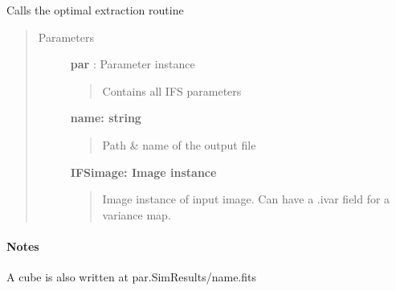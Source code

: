 \documentclass[letterpaper,10pt,english]{sphinxmanual}
\begin{document}

\begin{fulllineitems}
\label{tools:tools.reduction.intOptimalExtract}
Calls the optimal extraction routine
\begin{quote}\begin{description}
\item[{Parameters}] \leavevmode
\textbf{par} :   Parameter instance
\begin{quote}

Contains all IFS parameters
\end{quote}

\textbf{name: string}
\begin{quote}

Path \& name of the output file
\end{quote}

\textbf{IFSimage: Image instance}
\begin{quote}

Image instance of input image. Can have a .ivar field for a variance map.
\end{quote}

\end{description}\end{quote}
\paragraph{Notes}

A cube is also written at par.SimResults/name.fits

\end{fulllineitems}

\end{document}
